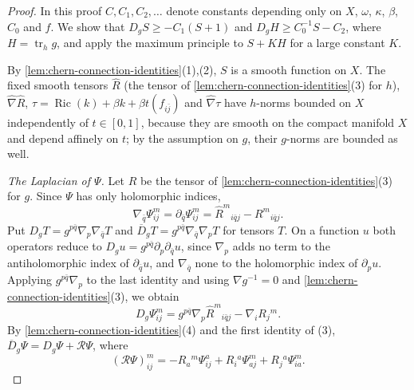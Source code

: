 \begin{proof}
In this proof $C,C_1,C_2,\ldots$ denote constants depending only on $X$, $\omega$, $\kappa$, $\beta$, $C_0$ and $f$. We show that $D_gS\geq-C_1(S+1)$ and $D_gH\geq C_0^{-1}S-C_2$, where $H=\operatorname{tr}_hg$, and apply the maximum principle to $S+KH$ for a large constant $K$.

By \cref{lem:chern-connection-identities}(1),(2), $S$ is a smooth function on $X$. The fixed smooth tensors $\widehat R$ (the tensor of \cref{lem:chern-connection-identities}(3) for $h$), $\widehat\nabla\widehat R$, $\tau=\operatorname{Ric}(k)+\beta k+\beta t(f_{i\bar j})$ and $\widehat\nabla\tau$ have $h$-norms bounded on $X$ independently of $t\in[0,1]$, because they are smooth on the compact manifold $X$ and depend affinely on $t$; by the assumption on $g$, their $g$-norms are bounded as well.

\emph{The Laplacian of $\Psi$.} Let $R$ be the tensor of \cref{lem:chern-connection-identities}(3) for $g$. Since $\Psi$ has only holomorphic indices,
\[
 \nabla_{\bar q}\Psi^m_{ij}=\partial_{\bar q}\Psi^m_{ij}=\widehat R^m{}_{i\bar qj}-R^m{}_{i\bar qj}.
\]
Put $D_gT=g^{p\bar q}\nabla_p\nabla_{\bar q}T$ and $\overline D_gT=g^{p\bar q}\nabla_{\bar q}\nabla_pT$ for tensors $T$. On a function $u$ both operators reduce to $D_gu=g^{p\bar q}\partial_p\partial_{\bar q}u$, since $\nabla_p$ adds no term to the antiholomorphic index of $\partial_{\bar q}u$, and $\nabla_{\bar q}$ none to the holomorphic index of $\partial_pu$. Applying $g^{p\bar q}\nabla_p$ to the last identity and using $\nabla g^{-1}=0$ and \cref{lem:chern-connection-identities}(3), we obtain
\begin{equation}\label{eq:elliptic-calabi-tensor}
 D_g\Psi^m_{ij}
  =g^{p\bar q}\nabla_p\widehat R^m{}_{i\bar qj}
                                      -\nabla_iR_j{}^m.
\end{equation}
By \cref{lem:chern-connection-identities}(4) and the first identity of (3), $\overline D_g\Psi=D_g\Psi+\mathcal R\Psi$, where
\[
 (\mathcal R\Psi)^m_{ij}
   =-R_a{}^m\Psi^a_{ij}+R_i{}^a\Psi^m_{aj}+R_j{}^a\Psi^m_{ia}.
\]


\end{proof}
